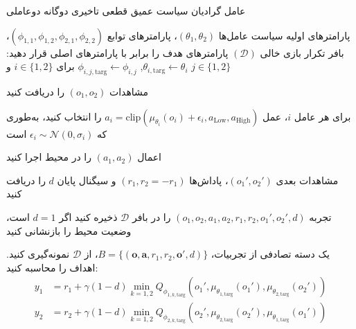 \begin{algorithm}[H]
    \caption{عامل گرادیان سیاست عمیق قطعی تاخیری دوگانه دو­عاملی}\label{alg:MA-TD3}
    \begin{algorithmic}[1]
         پارامترهای اولیه سیاست عامل‌ها $(\theta_1, \theta_2)$، پارامترهای توابع  $(\phi_{1,1}, \phi_{1,2}, \phi_{2,1}, \phi_{2,2})$، بافر تکرار بازی خالی $(\mathcal{D})$
        \State پارامترهای هدف را برابر با پارامترهای اصلی قرار دهید: 
        \Statex \hspace{\algorithmicindent}
        $\theta_{i,\text{targ}} \leftarrow \theta_i$, $\phi_{i,j,\text{targ}} \leftarrow \phi_{i,j}$ برای $i \in \{1, 2\}$ و $j \in \{1, 2\}$
        
            \State \parbox[t]{\dimexpr\linewidth-\algorithmicindent}{
            مشاهدات $(o_1, o_2)$ را دریافت کنید
            \strut}
            \State \parbox[t]{\dimexpr\linewidth-\algorithmicindent}{
            برای هر عامل $i$، عمل $a_i = \text{clip}(\mu_{\theta_i}(o_i) + \epsilon_i, a_{\text{Low}}, a_{\text{High}})$ را انتخاب کنید، به‌طوری که $\epsilon_i \sim \mathcal{N}(0, \sigma_i)$ است
            \strut}
            \State اعمال $(a_1, a_2)$ را در محیط اجرا کنید
            \State \parbox[t]{\dimexpr\linewidth-\algorithmicindent}{
            مشاهدات بعدی $(o_1', o_2')$، پاداش‌ها $(r_1, r_2=-r_1)$ و سیگنال پایان $d$ را دریافت کنید
            \strut}
            \State تجربه $(o_1, o_2, a_1, a_2, r_1, r_2, o_1', o_2', d)$ را در بافر $\mathcal{D}$ ذخیره کنید
            \State اگر $d=1$ است، وضعیت محیط را بازنشانی کنید
            
                    \State %
                    یک دسته تصادفی از تجربیات، $B = \{(\boldsymbol{o}, \boldsymbol{a}, r_1, r_2, \boldsymbol{o}', d)\}$، از $\mathcal{D}$ نمونه‌گیری کنید.
                    \State اهداف را محاسبه کنید:
                     \vspace{-15pt}
                    \begin{align*}
                        y_1 &= r_1 + \gamma (1-d) \min_{k=1,2} Q_{\phi_{1,k,\text{targ}}}(o_1', \mu_{\theta_{1,\text{targ}}}(o_1'), \mu_{\theta_{2,\text{targ}}}(o_2')) \\
                        y_2 &= r_2 + \gamma (1-d) \min_{k=1,2} Q_{\phi_{2,k,\text{targ}}}(o_2', \mu_{\theta_{2,\text{targ}}}(o_2'), \mu_{\theta_{1,\text{targ}}}(o_1'))
                    \end{align*}
                    \vspace{-35pt}
                    

\end{algorithmic}
\end{algorithm}

